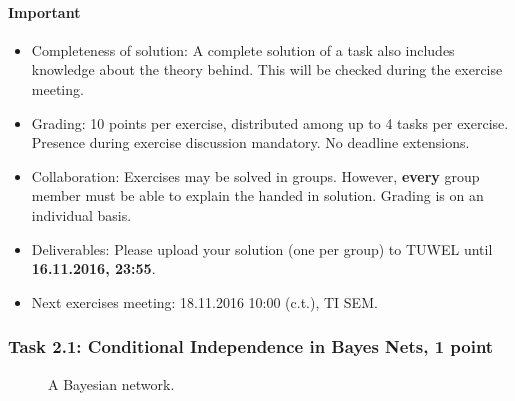 \documentclass[12pt,a4paper,oneside]{article}
\begin{document}
\paragraph{Important}
\begin{itemize}
  \item Completeness of solution: A complete solution of a task also
    includes knowledge about the theory behind. This will be checked
    during the exercise meeting.
  \item Grading: 10 points per exercise, distributed among up to 4
    tasks per exercise. Presence during exercise discussion
    mandatory. No deadline extensions.
  \item Collaboration: Exercises may be solved in groups. However, {\bf every}
    group member must be able to explain the handed in solution. Grading is on
    an individual basis.
  \item Deliverables: Please upload your solution (one per group) to
    TUWEL until {\bf 16.11.2016, 23:55}.
  \item Next exercises meeting: 18.11.2016 10:00 (c.t.), TI SEM.
\end{itemize}


%
%
\subsubsection*{Task 2.1: Conditional Independence in Bayes Nets, 1 point}
\begin{figure}[ht]
  \centering
  \caption{A Bayesian network.}
  \label{fig:bn1}
\end{figure}
\end{document}
